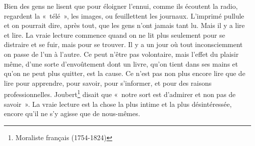 %
	{\vspace*{6pt}\par
	Bien des gens ne lisent que pour éloigner l'ennui, comme ils écoutent
la radio, regardent la «~télé~», les images, ou feuillettent les
journaux. L'imprimé pullule et on pourrait dire, après tout, que les
gens n'ont jamais tant lu. Mais il y a lire et lire. La vraie lecture
commence quand on ne lit plus seulement pour se distraire et se fuir,
mais pour se trouver. Il y a un jour où tout inconsciemment on passe
de l'un à l'autre. Ce peut n'être pas volontaire, mais l'effet du
plaisir même, d'une sorte d'envoûtement dont un livre, qu'on tient
dans ses mains et qu'on ne peut plus quitter, est la cause. Ce n'est
pas non plus encore lire que de lire pour apprendre, pour savoir,
pour s'informer, et pour des raisons professionnelles.
Joubert\footnote{Moraliste français (1754-1824)} disait que «~notre
sort est d'admirer et non pas de savoir~». La vraie lecture est la
chose la plus intime et la plus désintéressée, encore qu'il ne s'y
agisse que de nous-mêmes.

}
